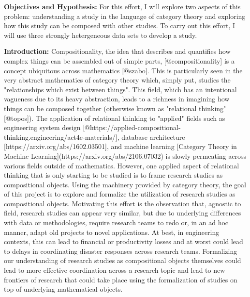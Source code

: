 \documentclass[11pt]{extarticle}
\begin{document}
\textbf{Objectives and Hypothesis:} For this effort, I will explore two aspects of this problem: understanding a study in the language of category theory and exploring how this study can be composed with other studies.
To carry out this effort, I will use three strongly hetergeneous data sets to develop a study. 

\textbf{Introduction:} Compositionality, the idea that describes and quantifies how complex things can be assembled out of simple parts, [@compositionality] is a concept ubiquitous across mathematics [@szabo]. 
This is particularly seen in the very abstract mathematics of category theory which, simply put, studies the "relationships which exist between things". 
This field, which has an intentional vagueness due to its heavy abstraction, leads to a richness in imagining how things can be composed together (otherwise known as "relational thinking" [@topos]). 
The application of relational thinking to "applied" fields such as engineering system design [@https://applied-compositional-thinking.engineering/act4e-materials/], database architecture [https://arxiv.org/abs/1602.03501], and machine learning [Category Theory in Machine Learning](https://arxiv.org/abs/2106.07032) is slowly permeating across various fields outside of mathematics. 
However, one applied aspect of relational thinking that is only starting to be studied is to frame research studies as compositional objects. 
Using the machinery provided by category theory, the goal of this project is to explore and formalize the utilization of research studies as compositional objects. 
Motivating this effort is the observation that, agnostic to field, research studies can appear very similar, but due to underlying differences with data or methodologies, require research teams to redo or, in an ad hoc manner, adapt old projects to novel applications. 
At best, in engineering contexts, this can lead to financial or productivity losses and at worst could lead to delays in coordinating disaster responses across research teams. 
Formalizing our understanding of research studies as compositional objects themselves could lead to more effective coordination across a research topic and lead to new frontiers of research that could take place using the formalization of studies on top of underlying mathematical objects.
\end{document}
